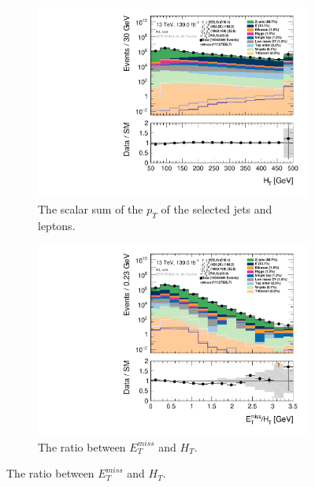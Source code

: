 \begin{figure}[H]\ContinuedFloat
\centering
    \begin{subfigure}[t!]{0.49\textwidth}
        \includegraphics[width=\textwidth]{Figures/ML_cuts/hist1d_HT_ML_cuts.pdf}
    \caption{The scalar sum of the $p_T$ of the selected jets and leptons.}
    \label{fig:my_label}
    \end{subfigure}
    \begin{subfigure}[t!]{0.49\textwidth}
        \includegraphics[width=\textwidth]{Figures/ML_cuts/hist1d_met_HT_ML_cuts.pdf}
    \caption{The ratio between $E_T^{miss}$ and $H_T$.}
    \label{fig:my_label}
    \end{subfigure}

\end{figure}
